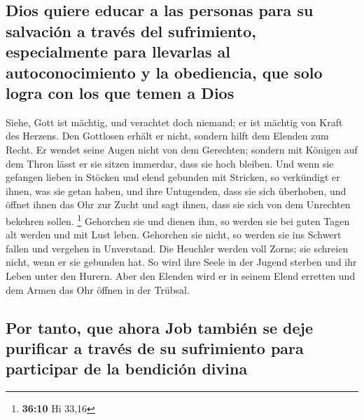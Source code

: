 \hypertarget{dios-quiere-educar-a-las-personas-para-su-salvaciuxf3n-a-travuxe9s-del-sufrimiento-especialmente-para-llevarlas-al-autoconocimiento-y-la-obediencia-que-solo-logra-con-los-que-temen-a-dios}{%
\subsection{Dios quiere educar a las personas para su salvación a través
del sufrimiento, especialmente para llevarlas al autoconocimiento y la
obediencia, que solo logra con los que temen a
Dios}\label{dios-quiere-educar-a-las-personas-para-su-salvaciuxf3n-a-travuxe9s-del-sufrimiento-especialmente-para-llevarlas-al-autoconocimiento-y-la-obediencia-que-solo-logra-con-los-que-temen-a-dios}}

 Siehe, Gott ist mächtig, und verachtet doch niemand; er
ist mächtig von Kraft des Herzens.  Den Gottlosen erhält
er nicht, sondern hilft dem Elenden zum Recht.  Er wendet
seine Augen nicht von dem Gerechten; sondern mit Königen auf dem Thron
lässt er sie sitzen immerdar, dass sie hoch bleiben.  Und
wenn sie gefangen lieben in Stöcken und elend gebunden mit Stricken,
 so verkündigt er ihnen, was sie getan haben, und ihre
Untugenden, dass sie sich überhoben,  und öffnet ihnen
das Ohr zur Zucht und sagt ihnen, dass sie sich von dem Unrechten
bekehren sollen. \footnote{\textbf{36:10} Hi 33,16} 
Gehorchen sie und dienen ihm, so werden sie bei guten Tagen alt werden
und mit Lust leben.  Gehorchen sie nicht, so werden sie
ins Schwert fallen und vergehen in Unverstand.  Die
Heuchler werden voll Zorns; sie schreien nicht, wenn er sie gebunden
hat.  So wird ihre Seele in der Jugend sterben und ihr
Leben unter den Hurern.  Aber den Elenden wird er in
seinem Elend erretten und dem Armen das Ohr öffnen in der Trübsal.

\hypertarget{por-tanto-que-ahora-job-tambiuxe9n-se-deje-purificar-a-travuxe9s-de-su-sufrimiento-para-participar-de-la-bendiciuxf3n-divina}{%
\subsection{Por tanto, que ahora Job también se deje purificar a través
de su sufrimiento para participar de la bendición
divina}\label{por-tanto-que-ahora-job-tambiuxe9n-se-deje-purificar-a-travuxe9s-de-su-sufrimiento-para-participar-de-la-bendiciuxf3n-divina}}

